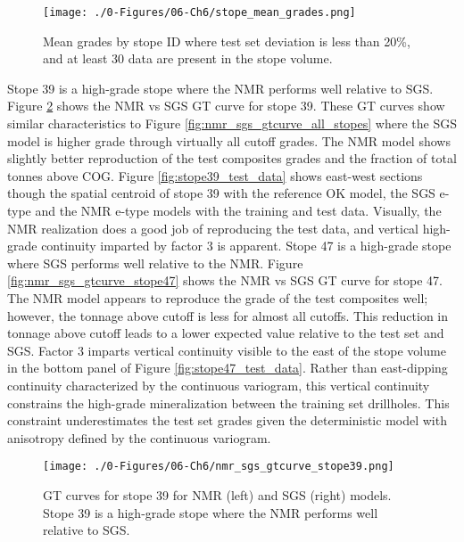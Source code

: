 \begin{figure}[htb!]
    \centering
    \texttt{[image: ./0-Figures/06-Ch6/stope\_mean\_grades.png]}
    \caption{Mean grades by stope ID where test set deviation is less than 20\%, and at least 30 data are present in the stope volume. }
    \label{fig:stope_mean_grades}
\end{figure}

Stope 39 is a high-grade stope where the \gls{NMR} performs well relative to \gls{SGS}. Figure \ref{fig:nmr_sgs_gtcurve_stope39} shows the \gls{NMR} vs \gls{SGS} \gls{GT} curve for stope 39. These \gls{GT} curves show similar characteristics to Figure \ref{fig:nmr_sgs_gtcurve_all_stopes} where the \gls{SGS} model is higher grade through virtually all cutoff grades. The \gls{NMR} model shows slightly better reproduction of the test composites grades and the fraction of total tonnes above \gls{COG}. Figure \ref{fig:stope39_test_data} shows east-west sections though the spatial centroid of stope 39 with the reference \gls{OK} model, the \gls{SGS} e-type and the \gls{NMR} e-type models with the training and test data. Visually, the \gls{NMR} realization does a good job of reproducing the test data, and vertical high-grade continuity imparted by factor 3 is apparent. Stope 47 is a high-grade stope where \gls{SGS} performs well relative to the \gls{NMR}. Figure \ref{fig:nmr_sgs_gtcurve_stope47} shows the \gls{NMR} vs \gls{SGS} \gls{GT} curve for stope 47. The \gls{NMR} model appears to reproduce the grade of the test composites well; however, the tonnage above cutoff is less for almost all cutoffs. This reduction in tonnage above cutoff leads to a lower expected value relative to the test set and \gls{SGS}. Factor 3 imparts vertical continuity visible to the east of the stope volume in the bottom panel of Figure \ref{fig:stope47_test_data}. Rather than east-dipping continuity characterized by the continuous variogram, this vertical continuity constrains the high-grade mineralization between the training set drillholes. This constraint underestimates the test set grades given the deterministic model with anisotropy defined by the continuous variogram.

\begin{figure}[htb!]
    \centering
    \texttt{[image: ./0-Figures/06-Ch6/nmr\_sgs\_gtcurve\_stope39.png]}
    \caption{\Gls{GT} curves for stope 39 for \gls{NMR} (left) and \gls{SGS} (right) models. Stope 39 is a high-grade stope where the \gls{NMR} performs well relative to \gls{SGS}.}
    \label{fig:nmr_sgs_gtcurve_stope39}
\end{figure}

